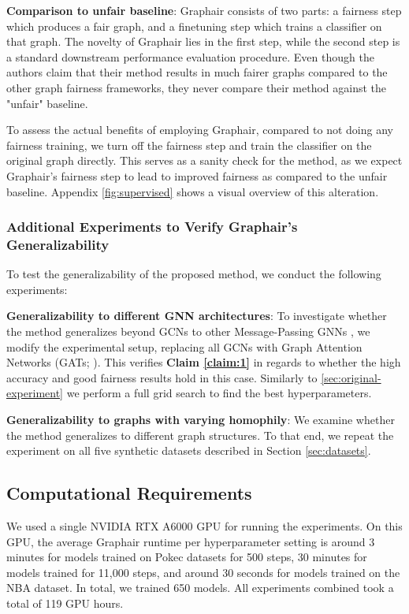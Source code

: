 \textbf{Comparison to unfair baseline}:
Graphair consists of two parts: a fairness step which produces a fair graph, and a finetuning step which trains a classifier on that graph. 
The novelty of Graphair lies in the first step, while the second step is a standard downstream performance evaluation procedure. 
Even though the authors claim that their method results in much fairer graphs compared to the other graph fairness frameworks, they never compare their method against the "unfair" baseline.

To assess the actual benefits of employing Graphair, compared to not doing any fairness training, we turn off the fairness step and train the classifier on the original graph directly. 
This serves as a sanity check for the method, as we expect Graphair's fairness step to lead to improved fairness as compared to the unfair baseline. 
Appendix \ref{fig:supervised} shows a visual overview of this alteration. 

\subsubsection{Additional Experiments to Verify Graphair’s Generalizability}

To test the generalizability of the proposed method, we conduct the following experiments:

\textbf{Generalizability to different GNN architectures}: To investigate whether the method generalizes beyond GCNs to other Message-Passing GNNs \citep{gilmer2017neural}, we modify the experimental setup, replacing all GCNs with Graph Attention Networks (GATs; \citealp{velivckovic2017graph}). This verifies \textbf{Claim \ref{claim:1}} in regards to whether the high accuracy and good fairness results hold in this case. Similarly to \ref{sec:original-experiment} we perform a full grid search to find the best hyperparameters.

\textbf{Generalizability to graphs with varying homophily}: We examine whether the method generalizes to different graph structures. To that end, we repeat the experiment on all five synthetic datasets described in Section \ref{sec:datasets}.

\subsection{Computational Requirements}

We used a single NVIDIA RTX A6000 GPU for running the experiments. 
On this GPU, the average Graphair runtime per hyperparameter setting is around 3 minutes for models trained on Pokec datasets for 500 steps, 30 minutes for models trained for 11,000 steps, and around 30 seconds for models trained on the NBA dataset. 
In total, we trained 650 models.
All experiments combined took a total of 119 GPU hours.

